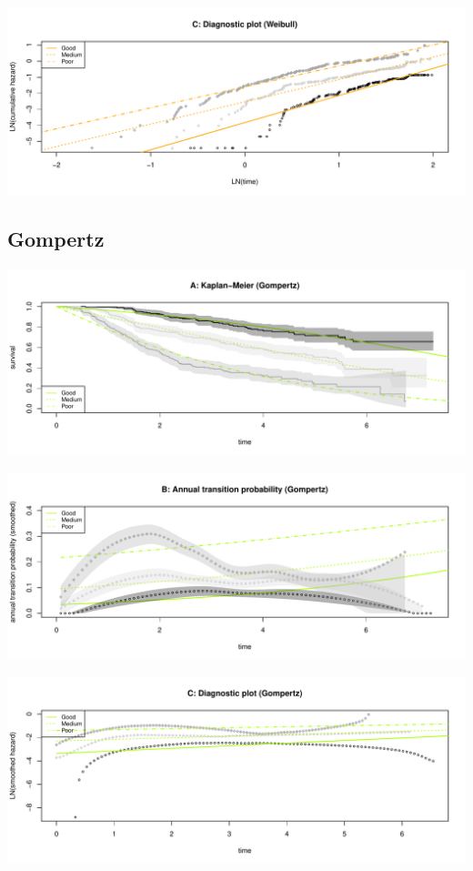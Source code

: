 \documentclass[]{article}
\begin{document}
\begin{flushleft}\includegraphics[height=0.25\textheight]{Images/weib-3} \end{flushleft}

\newpage 

\subsection{Gompertz}\label{gompertz}

\begin{flushleft}\includegraphics[height=0.25\textheight]{Images/gom-1} \end{flushleft}

\begin{flushleft}\includegraphics[height=0.25\textheight]{Images/gom-2} \end{flushleft}

\begin{flushleft}\includegraphics[height=0.25\textheight]{Images/gom-3} \end{flushleft}
\end{document}
